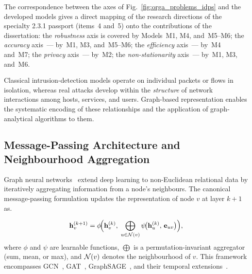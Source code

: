 The correspondence between the axes of
Fig.~\ref{fig:orga_problems_idps} and the developed models gives a
direct mapping of the research directions of the specialty 2.3.1
passport (items~4 and~5) onto the contributions of the dissertation:
the \emph{robustness} axis is covered by Models~M1, M4, and~M5--M6;
the \emph{accuracy} axis~--- by~M1, M3, and~M5--M6;
the \emph{efficiency} axis~--- by~M4 and~M7;
the \emph{privacy} axis~--- by~M2;
the \emph{non-stationarity} axis~--- by~M1, M3, and~M6.

\label{sec:graph_representation}

Classical intrusion-detection models operate on individual packets or
flows in isolation, whereas real attacks develop within the \emph{structure}
of network interactions among hosts, services, and users. Graph-based
representation enables the systematic encoding of these relationships and
the application of graph-analytical algorithms to them.

\label{sec:gnn_vulnerability}%

\subsection{Message-Passing Architecture and Neighbourhood Aggregation}

Graph neural networks~\cite{Kipf2017,Velickovic2018,Hamilton2017} extend deep learning to non-Euclidean relational data by iteratively aggregating information from a node's neighbours. The canonical message-passing formulation updates the representation of node $v$ at layer $k+1$ as.

\begin{equation}
\mathbf{h}_v^{(k+1)}
= \phi\!\Bigl(\mathbf{h}_v^{(k)},\;
  \bigoplus_{u\in\mathcal{N}(v)}
    \psi\!\bigl(\mathbf{h}_u^{(k)},\, \mathbf{e}_{uv}\bigr)\Bigr),
\label{eq:ch1_mp}
\end{equation}where $\phi$ and $\psi$ are learnable functions, $\bigoplus$ is a permutation-invariant aggregator (sum, mean, or max), and $\mathcal{N}(v)$ denotes the neighbourhood of $v$. This framework encompasses GCN~\cite{Kipf2017}, GAT~\cite{Velickovic2018}, GraphSAGE~\cite{Hamilton2017}, and their temporal extensions~\cite{Xu2020tgat,Rossi2020,Pei2020tgn,Kazemi2020,Schlichtkrull2018}.

